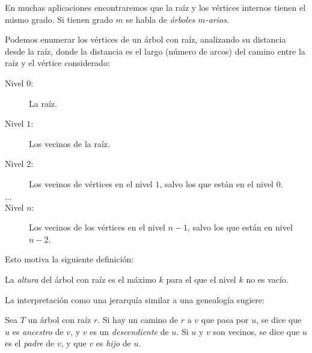   En muchas aplicaciones encontraremos
  que la raíz y los vértices internos tienen el mismo grado.
  Si tienen grado \(m\)
  se habla de \emph{árboles \(m\)\nobreakdash-arios}.

  Podemos enumerar los vértices de un árbol con raíz,
  analizando su distancia desde la raíz,
  donde la distancia es el largo
  (número de arcos)
  del camino entre la raíz y el vértice considerado:
  \begin{description}
  \item[\boldmath Nivel \(0\):\unboldmath]
    La raíz.
  \item[\boldmath Nivel \(1\):\unboldmath]
    Los vecinos de la raíz.
  \item[\boldmath Nivel \(2\):\unboldmath]
    Los vecinos de vértices en el nivel \(1\),
    salvo los que están en el nivel \(0\).
  \item[\boldmath\(\dotsb\)\unboldmath]
  \item[\boldmath Nivel \(n\):\unboldmath]
    Los vecinos de los vértices en el nivel \(n - 1\),
    salvo los que están en nivel \(n - 2\).
  \end{description}
  Esto motiva la siguiente definición:
  \begin{definition}
    La \emph{altura} del árbol con raíz
    es el máximo \(k\) para el que el nivel \(k\) no es vacío.
  \end{definition}
  La interpretación como una jerarquía
  similar a una genealogía sugiere:
  \begin{definition}
    Sea \(T\) un árbol con raíz \(r\).
    Si hay un camino de \(r\) a \(v\) que pasa por \(u\),
    se dice que \(u\) es \emph{ancestro} de \(v\),
    y \(v\) es un \emph{descendiente} de \(u\).
    Si \(u\) y \(v\) son vecinos,
    se dice que \(u\) es el \emph{padre} de \(v\),
    y que \(v\) es \emph{hijo} de \(u\).
  \end{definition}


